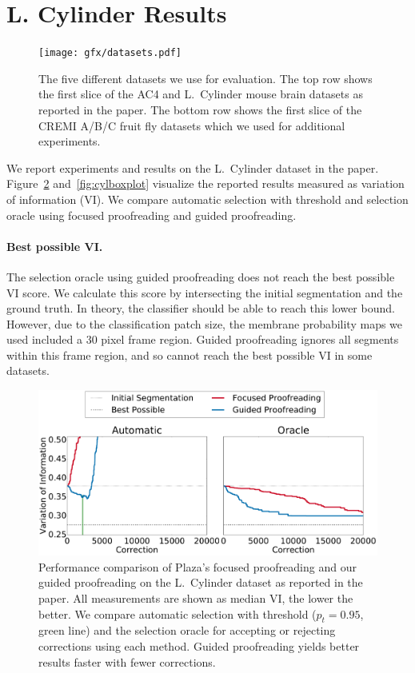 \section{L. Cylinder Results}

\begin{figure}[t]
\centering
\texttt{[image: gfx/datasets.pdf]}
\caption{The five different datasets we use for evaluation. The top row shows the first slice of the AC4 and L.~Cylinder mouse brain datasets as reported in the paper. The bottom row shows the first slice of the CREMI A/B/C fruit fly datasets which we used for additional experiments.}
\label{fig:datasets}
\end{figure}

We report experiments and results on the L.~Cylinder dataset in the paper. Figure~\ref{fig:cyltrails} and~\ref{fig:cylboxplot} visualize the reported results measured as variation of information (VI). We compare automatic selection with threshold and selection oracle using focused proofreading and guided proofreading.

\paragraph{Best possible VI.} The selection oracle using guided proofreading does not reach the best possible VI score. We calculate this score by intersecting the initial segmentation and the ground truth. In theory, the classifier should be able to reach this lower bound. However, due to the classification patch size, the membrane probability maps we used included a 30 pixel frame region. Guided proofreading ignores all segments within this frame region, and so cannot reach the best possible VI in some datasets.

\begin{figure}[t]
\centering
\includegraphics[width=\linewidth]{gfx/cyl_trails.pdf}
\caption{Performance comparison of Plaza's focused proofreading and our guided proofreading on the L.~Cylinder dataset as reported in the paper. All measurements are shown as median VI, the lower the better. We compare automatic selection with threshold ($p_t=0.95$, green line) and the selection oracle for accepting or rejecting corrections using each method. Guided proofreading yields better results faster with fewer corrections.}
\label{fig:cyltrails}
\end{figure}

